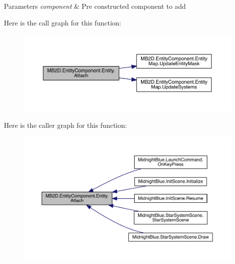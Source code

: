 \begin{DoxyParams}{Parameters}
{\em component} & Pre constructed component to add\\
\hline
\end{DoxyParams}
Here is the call graph for this function\+:
\nopagebreak
\begin{figure}[H]
\begin{center}
\leavevmode
\includegraphics[width=350pt]{class_m_b2_d_1_1_entity_component_1_1_entity_aa86d1be62df6d89b981d1000c856a306_cgraph}
\end{center}
\end{figure}
Here is the caller graph for this function\+:
\nopagebreak
\begin{figure}[H]
\begin{center}
\leavevmode
\includegraphics[width=350pt]{class_m_b2_d_1_1_entity_component_1_1_entity_aa86d1be62df6d89b981d1000c856a306_icgraph}
\end{center}
\end{figure}
\hypertarget{class_m_b2_d_1_1_entity_component_1_1_entity_a53ffea8d43423903712540fc2df6b82d}{}\label{class_m_b2_d_1_1_entity_component_1_1_entity_a53ffea8d43423903712540fc2df6b82d} 
